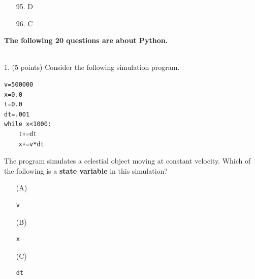 \documentclass{article}
\newcounter{question}
\begin{document}

\begin{enumerate}
\item[95.] D
\item[96.] C
\end{enumerate}

\newpage


\pagebreak \noindent \textbf{The following 20 questions are about Python.}
\\\\




\noindent
\begin{minipage}{\textwidth}
1. (5 points)
Consider the following simulation program.
\begin{verbatim}
v=500000
x=0.0
t=0.0
dt=.001
while x<1000:
    t+=dt
    x+=v*dt
\end{verbatim}
The program simulates a celestial object moving at constant velocity. Which of the following is a \textbf{state variable} in this simulation?

\begin{enumerate}
\item[(A)]
\begin{verbatim}v\end{verbatim}

\item[(B)]
\begin{verbatim}x\end{verbatim}

\item[(C)]
\begin{verbatim}dt\end{verbatim}

\end{enumerate}
\end{minipage}
\vspace{10em}
\filbreak\vfil{}\vfilneg
\end{document}
